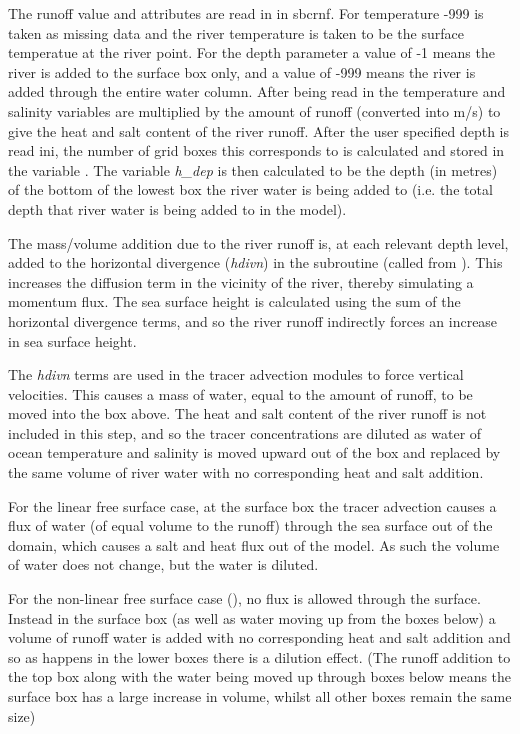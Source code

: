 \documentclass[../tex_main/NEMO_manual]{subfiles}
\begin{document}
The runoff value and attributes are read in in sbcrnf.  
For temperature -999 is taken as missing data and the river temperature is taken to be the 
surface temperatue at the river point.
For the depth parameter a value of -1 means the river is added to the surface box only, 
and a value of -999 means the river is added through the entire water column. 
After being read in the temperature and salinity variables are multiplied by the amount of runoff (converted into m/s) 
to give the heat and salt content of the river runoff.
After the user specified depth is read ini, the number of grid boxes this corresponds to is 
calculated and stored in the variable .
The variable \textit{h\_dep} is then calculated to be the depth (in metres) of the bottom of the 
lowest box the river water is being added to (i.e. the total depth that river water is being added to in the model).

The mass/volume addition due to the river runoff is, at each relevant depth level, added to the horizontal divergence 
(\textit{hdivn}) in the subroutine  (called from ).
This increases the diffusion term in the vicinity of the river, thereby simulating a momentum flux.
The sea surface height is calculated using the sum of the horizontal divergence terms, and so the 
river runoff indirectly forces an increase in sea surface height. 

The \textit{hdivn} terms are used in the tracer advection modules to force vertical velocities.
This causes a mass of water, equal to the amount of runoff, to be moved into the box above. 
The heat and salt content of the river runoff is not included in this step, and so the tracer 
concentrations are diluted as water of ocean temperature and salinity is moved upward out of the box 
and replaced by the same volume of river water with no corresponding heat and salt addition.

For the linear free surface case, at the surface box the tracer advection causes a flux of water 
(of equal volume to the runoff) through the sea surface out of the domain, which causes a salt and heat flux out of the model.
As such the volume of water does not change, but the water is diluted.

For the non-linear free surface case (), no flux is allowed through the surface.
Instead in the surface box (as well as water moving up from the boxes below) a volume of runoff water 
is added with no corresponding heat and salt addition and so as happens in the lower boxes there is a dilution effect.
(The runoff addition to the top box along with the water being moved up through boxes below means the surface box has a large 
increase in volume, whilst all other boxes remain the same size)
\end{document}
